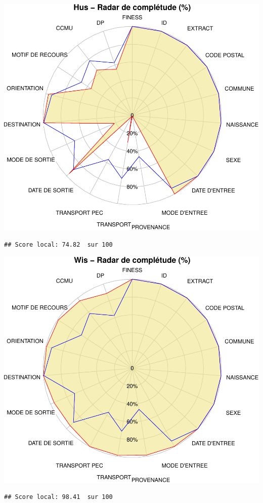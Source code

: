 \documentclass[]{article}
\begin{document}
\includegraphics{completude_files/figure-latex/finess-9.pdf}

\begin{verbatim}
## Score local: 74.82  sur 100
\end{verbatim}

\includegraphics{completude_files/figure-latex/finess-10.pdf}

\begin{verbatim}
## Score local: 98.41  sur 100
\end{verbatim}
\end{document}
